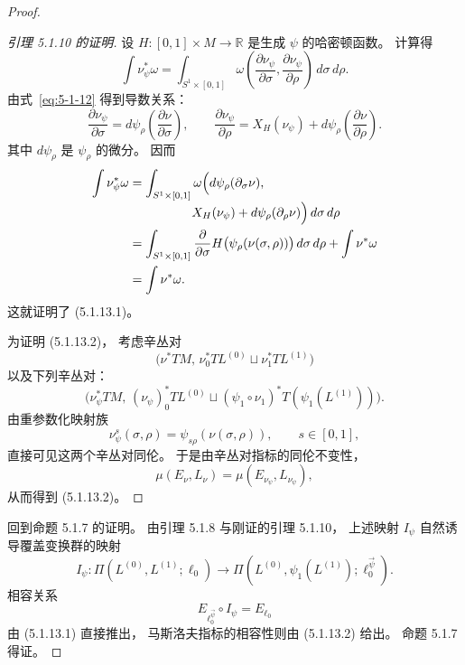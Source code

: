 \begin{proof}
\begin{proof}[引理 5.1.10 的证明]
设 $H:[0,1]\times M\to\mathbb R$
是生成 $\psi$ 的哈密顿函数。
计算得
\[
\int\nu_\psi^*\omega
=\int_{S^1\times[0,1]}
\omega\left(
\frac{\partial\nu_\psi}{\partial\sigma},
\frac{\partial\nu_\psi}{\partial\rho}
\right)\,d\sigma\,d\rho.
\]
由式~\eqref{eq:5-1-12}
得到导数关系：
\[
\frac{\partial\nu_\psi}{\partial\sigma}
=d\psi_\rho
\left(\frac{\partial\nu}{\partial\sigma}\right),
\qquad
\frac{\partial\nu_\psi}{\partial\rho}
=X_H(\nu_\psi)
+d\psi_\rho
\left(\frac{\partial\nu}{\partial\rho}\right).
\]
其中 $d\psi_\rho$ 是 $\psi_\rho$ 的微分。
因而
\[
\begin{aligned}
\int\nu_\psi^*\omega
&=\int_{S^1\times[0,1]}
\omega\Bigl(
d\psi_\rho(\partial_\sigma\nu),\\[-1mm]
&\hspace{5em}
X_H(\nu_\psi)
+d\psi_\rho(\partial_\rho\nu)\Bigr)
\,d\sigma\,d\rho\\
&=\int_{S^1\times[0,1]}
\frac{\partial}{\partial\sigma}
H\bigl(\psi_\rho(\nu(\sigma,\rho))\bigr)
\,d\sigma\,d\rho
+\int\nu^*\omega\\
&=\int\nu^*\omega.
\end{aligned}
\]
这就证明了 (5.1.13.1)。

为证明 (5.1.13.2)，
考虑辛丛对
\[
\bigl(
\nu^*TM,\,
\nu_0^*TL^{(0)}
\sqcup\nu_1^*TL^{(1)}
\bigr)
\]
以及下列辛丛对：
\[
\bigl(
\nu_\psi^*TM,\,
(\nu_\psi)_0^*TL^{(0)}
\sqcup
(\psi_1\circ\nu_1)^*
T(\psi_1(L^{(1)}))
\bigr).
\]
由重参数化映射族
\[
\nu_\psi^s(\sigma,\rho)
=\psi_{s\rho}(\nu(\sigma,\rho)),
\qquad s\in[0,1],
\]
直接可见这两个辛丛对同伦。
于是由辛丛对指标的同伦不变性，
\[
\mu(E_\nu,L_\nu)
=\mu(E_{\nu_\psi},L_{\nu_\psi}),
\]
从而得到 (5.1.13.2)。
\end{proof}

回到命题 5.1.7 的证明。
由引理 5.1.8 与刚证的引理 5.1.10，
上述映射 $I_\psi$
自然诱导覆盖变换群的映射
\[
I_\psi:
\Pi(L^{(0)},L^{(1)};\ell_0)
\longrightarrow
\Pi(L^{(0)},\psi_1(L^{(1)});
\ell_0^{\vec\psi}).
\]
相容关系
\[
E_{\ell_0^{\vec\psi}}\circ I_\psi
=E_{\ell_0}
\]
由 (5.1.13.1) 直接推出，
马斯洛夫指标的相容性则由
(5.1.13.2) 给出。
命题 5.1.7 得证。
\end{proof}

